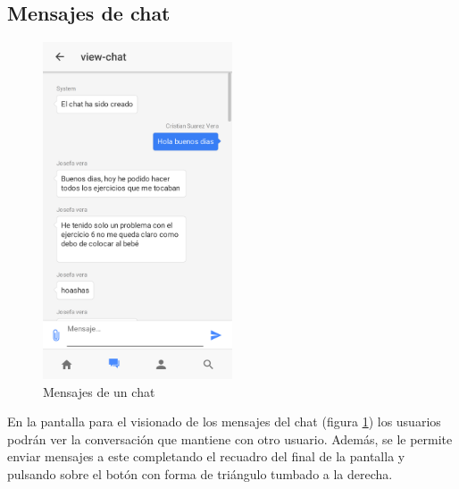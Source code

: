 \subsection{Mensajes de chat}
\begin{figure}[!h]
    \centering
    \includegraphics[width=0.5\textwidth]{images/screenshots/Vista-chat.png}
    \caption{Mensajes de un chat}
    \label{mensajes-chat}
\end{figure}

En la pantalla para el visionado de los mensajes del chat
(figura \ref{mensajes-chat}) los usuarios podrán ver la conversación que
mantiene con otro usuario. Además, se le permite enviar mensajes a este
completando el recuadro del final de la pantalla y pulsando sobre el botón
con forma de triángulo tumbado a la derecha.